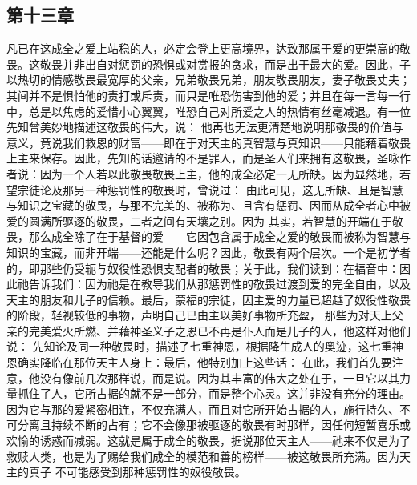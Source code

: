 
\subsection{第十三章}

\par

凡已在这成全之爱上站稳的人，必定会登上更高境界，达致那属于爱的更崇高的敬畏。这敬畏并非出自对惩罚的恐惧或对赏报的贪求，而是出于最大的爱。因此，子以热切的情感敬畏最宽厚的父亲，兄弟敬畏兄弟，朋友敬畏朋友，妻子敬畏丈夫；其间并不是惧怕他的责打或斥责，而只是唯恐伤害到他的爱；并且在每一言每一行中，总是以焦虑的爱惜小心翼翼，唯恐自己对所爱之人的热情有丝毫减退。有一位先知曾美妙地描述这敬畏的伟大，说： 他再也无法更清楚地说明那敬畏的价值与意义，竟说我们救恩的财富——即在于对天主的真智慧与真知识——只能藉着敬畏上主来保存。因此，先知的话邀请的不是罪人，而是圣人们来拥有这敬畏，圣咏作者说：因为一个人若以此敬畏敬畏上主，他的成全必定一无所缺。因为显然地，若望宗徒论及那另一种惩罚性的敬畏时，曾说过： 由此可见，这无所缺、且是智慧与知识之宝藏的敬畏，与那不完美的、被称为、且含有惩罚、因而从成全者心中被爱的圆满所驱逐的敬畏，二者之间有天壤之别。因为 其实，若智慧的开端在于敬畏，那么成全除了在于基督的爱——它因包含属于成全之爱的敬畏而被称为智慧与知识的宝藏，而非开端——还能是什么呢？因此，敬畏有两个层次。一个是初学者的，即那些仍受轭与奴役性恐惧支配者的敬畏；关于此，我们读到：在福音中：因此祂告诉我们：因为祂是在教导我们从那惩罚性的敬畏过渡到爱的完全自由，以及天主的朋友和儿子的信赖。最后，蒙福的宗徒，因主爱的力量已超越了奴役性敬畏的阶段，轻视较低的事物，声明自己已由主以美好事物所充盈， 那些为对天上父亲的完美爱火所燃、并藉神圣义子之恩已不再是仆人而是儿子的人，他这样对他们说： 先知论及同一种敬畏时，描述了七重神恩，根据降生成人的奥迹，这七重神恩确实降临在那位天主人身上：最后，他特别加上这些话： 在此，我们首先要注意，他没有像前几次那样说，而是说。因为其丰富的伟大之处在于，一旦它以其力量抓住了人，它所占据的就不是一部分，而是整个心灵。这并非没有充分的理由。因为它与那的爱紧密相连，不仅充满人，而且对它所开始占据的人，施行持久、不可分离且持续不断的占有；它不会像那被驱逐的敬畏有时那样，因任何短暂喜乐或欢愉的诱惑而减弱。这就是属于成全的敬畏，据说那位天主人——祂来不仅是为了救赎人类，也是为了赐给我们成全的模范和善的榜样——被这敬畏所充满。因为天主的真子 不可能感受到那种惩罚性的奴役敬畏。\par

